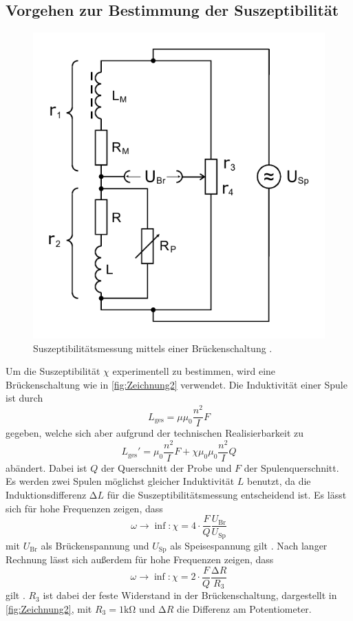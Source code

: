 \subsection{Vorgehen zur Bestimmung der Suszeptibilität}
\begin{figure}
    \center
    \includegraphics[width=0.5\linewidth]{pictures/Zeichnung2.pdf}
    \caption{Suszeptibilitätsmessung mittels einer Brückenschaltung \cite{v606}.}
    \label{fig:Zeichnung2}
\end{figure}
Um die Suszeptibilität $\chi$ experimentell zu bestimmen, wird eine Brückenschaltung wie in \autoref{fig:Zeichnung2} verwendet.
Die Induktivität einer Spule ist durch
\begin{equation*}
    L_\text{ges} = \mu \mu_0 \frac{n^2}{I} F
\end{equation*}
gegeben, welche sich aber aufgrund der technischen Realisierbarkeit zu
\begin{equation}
    L_\text{ges} ' = \mu_0 \frac{n^2}{I} F + \chi \mu_0 \mu_0 \frac{n^2}{I} Q
\end{equation}
abändert. Dabei ist $Q$ der Querschnitt der Probe und $F$ der Spulenquerschnitt.
Es werden zwei Spulen möglichst gleicher Induktivität $L$ benutzt, da die Induktionsdifferenz $\increment L$ für die Suszeptibilitätsmessung entscheidend ist.
Es lässt sich für hohe Frequenzen zeigen, dass
\begin{equation}\label{eq:delU}
    \omega \rightarrow \inf: \chi = 4 \cdot \frac{F}{Q} \frac{U_\text{Br}}{U_\text{Sp}}
\end{equation}
mit $U_\text{Br}$ als Brückenspannung und $U_\text{Sp}$ als Speisespannung gilt \cite{v606}.
Nach langer Rechnung lässt sich außerdem für hohe Frequenzen zeigen, dass
\begin{equation}\label{eq:delR}
    \omega \rightarrow \inf: \chi = 2 \cdot  \frac{F}{Q}\frac{\increment R}{R_3}
\end{equation}
gilt \cite{v606}.
$R_3$ ist dabei der feste Widerstand in der Brückenschaltung, dargestellt in \autoref{fig:Zeichnung2}, mit $R_3 = 1 \unit{\kilo\ohm}$ und $\increment R$ die Differenz am Potentiometer.